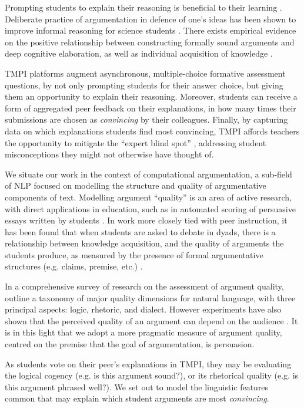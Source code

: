 \documentclass[notitlepage,12pt]{jedm}
\begin{document}
Prompting students to explain their reasoning is beneficial 
to their learning \cite{chi_eliciting_1994}. 
Deliberate practice of argumentation in defence of one's ideas has been shown 
to improve informal reasoning for science students \cite{venville_impact_2010}.
There exists empirical evidence on the positive relationship between 
constructing formally sound arguments and deep cognitive elaboration, as well 
as individual acquisition of knowledge \cite{stegmann_collaborative_2012}.

TMPI platforms augment asynchronous, multiple-choice formative assessment 
questions, by not only prompting students for their answer choice, but giving 
them an opportunity to explain their reasoning.
Moreover, students can receive a form of aggregated peer feedback on their 
explanations, in how many times their submissions are chosen as 
\textit{convincing} by their colleagues.
Finally, by capturing data on which explanations students find most convincing, 
TMPI affords teachers the opportunity to mitigate the ``expert blind spot'' 
\cite{nathan_expert_2001}, addressing student misconceptions they might not 
otherwise have thought of.

We situate our work in the context of computational argumentation, a sub-field 
of NLP focused on modelling the structure and quality of argumentative 
components of text.
Modelling argument ``quality'' is an area of active research, with direct 
applications in education, such as in automated scoring of 
persuasive essays written by students \cite{persing_modeling_2015} 
\cite{nguyen_argument_2018}.
In work more closely tied with peer instruction, it has been found that when 
students are asked to debate in dyads, there is a relationship between  
knowledge acquisition, and the quality of arguments the students produce, as 
measured by the presence of formal argumentative structures (e.g. claims, 
premise, etc.) \cite{garcia-mila_effect_2013}.

In a comprehensive survey of research on the assessment of argument quality, 
\cite{wachsmuth_computational_2017} outline a taxonomy of major quality 
dimensions for natural language, with three principal aspects: logic, rhetoric, 
and dialect. 
However experiments have also shown that the perceived quality of an argument 
can depend on the audience \cite{mercier_why_2011}. 
It is in this light that we adopt a more pragmatic measure of argument quality, 
centred on the premise that the goal of argumentation, is persuasion.

As students vote on their peer's explanations in TMPI, they may be evaluating 
the logical cogency (e.g. is this argument sound?), or its rhetorical quality 
(e.g. is this argument phrased well?). 
We set out to model the linguistic features common that may explain which 
student arguments are most \textit{convincing}.
\end{document}
